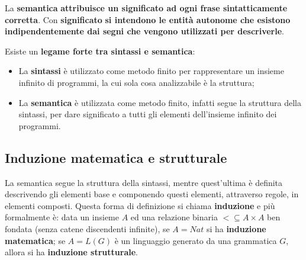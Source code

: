 \documentclass[a4paper]{article}
\begin{document}
	\noindent
	La \textcolor{Red3}{\textbf{semantica}} \textbf{attribuisce un significato ad ogni frase sintatticamente corretta}. Con \textcolor{Red3}{\textbf{significato}} \textbf{si intendono le entità autonome che esistono indipendentemente dai segni che vengono utilizzati per descriverle}.\newline

	\noindent
	Esiste un \textbf{legame forte tra sintassi e semantica}:
	\begin{itemize}
		\item La \textbf{sintassi} è utilizzato come metodo finito per rappresentare un insieme infinito di programmi, la cui sola cosa analizzabile è la struttura;
		\item La \textbf{semantica} è utilizzata come metodo finito, infatti segue la struttura della sintassi, per dare significato a tutti gli elementi dell'insieme infinito dei programmi.
	\end{itemize}\newpage

	\subsection{Induzione matematica e strutturale}

	La semantica segue la struttura della sintassi, mentre quest'ultima è definita descrivendo gli elementi base e componendo questi elementi, attraverso regole, in elementi composti. Questa forma di definizione si chiama \textcolor{Red3}{\textbf{induzione}} e più formalmente è: data un insieme $A$ ed una relazione binaria $< \subseteq A \times A$ ben fondata (senza catene discendenti infinite), se $A = Nat$ si ha \textbf{induzione matematica}; se $A = L\left(G\right)$ è un linguaggio generato da una grammatica $G$, allora si ha \textbf{induzione strutturale}.\newline
\end{document}
